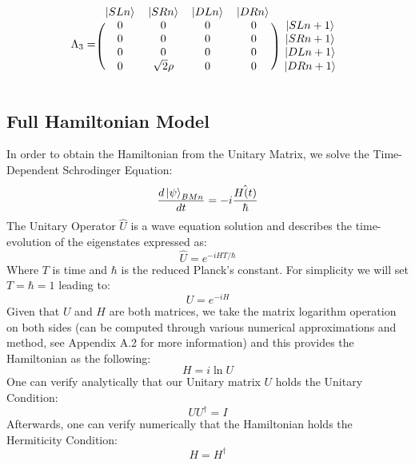 \begin{equation}
    \Lambda_{3} = 
    \begin{blockarray}{ccccc}
    \ket{SLn} & \ket{SRn} & \ket{DLn} & \ket{DRn}\\
    \begin{block}{(cccc)c}
    0 & 0 & 0 & 0 & \ket{SLn+1} \\
    0 & 0 & 0 & 0 & \ket{SRn+1} \\
    0 & 0 & 0 & 0 & \ket{DLn+1} \\
    0 & \sqrt{2}\rho & 0 & 0 & \ket{DRn+1} \\
    \end{block}
    \end{blockarray}
\end{equation}
\newpage
\subsection{Full Hamiltonian Model}
In order to obtain the Hamiltonian from the Unitary Matrix, we solve the Time-Dependent Schrodinger Equation:
\begin{equation}
    \frac{d\ket{\psi}_{BMn}}{dt} = -i\frac{\hat{H(t)}}{\hbar}
\end{equation}
The Unitary Operator $\hat{U}$ is a wave equation solution and describes the time-evolution of the eigenstates expressed as:
\begin{equation}
    \hat{U} = e^{-iHT/\hbar}
\end{equation}
Where $T$ is time and $\hbar$ is the reduced Planck's constant. For simplicity we will set $T = \hbar = 1$ leading to:
\begin{equation}
    U = e^{-iH}
\end{equation}
Given that $U$ and $H$ are both matrices, we take the matrix logarithm operation on both sides (can be computed through various numerical approximations and method, see Appendix A.2 for more information) and this provides the Hamiltonian as the following:
\begin{equation}
    H = i\ln U
\end{equation}
One can verify analytically that our Unitary matrix $U$ holds the Unitary Condition:
\begin{equation}
    UU^{\dagger} = I
\end{equation}
Afterwards, one can verify numerically that the Hamiltonian holds the Hermiticity Condition:
\begin{equation}
    H = H^{\dagger}
\end{equation}
\newpage
